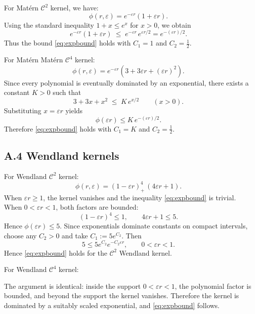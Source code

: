 \documentclass[preprint]{elsarticle}       %
\begin{document}
For Mat\'ern $\mathcal{C}^2$ kernel, we have:
\[
\phi(r,\varepsilon)=e^{-\varepsilon r}(1+\varepsilon r).
\]
Using the standard inequality $1+x\le e^x$ for $x>0$, we obtain
\[
e^{-\varepsilon r}(1+\varepsilon r)
\;\le\;
e^{-\varepsilon r}\,e^{\varepsilon r/2}
=
e^{-(\varepsilon r)/2}.
\]
Thus the bound \eqref{eq:expbound} holds with $C_1=1$ and $C_2=\tfrac12$.
\vspace{0.5cm}

For Mat\'ern Mat\'ern $\mathcal{C}^4$ kernel:
\[
\phi(r,\varepsilon)=e^{-\varepsilon r}\left(3 + 3\varepsilon r + (\varepsilon r)^2\right).
\]
Since every polynomial is eventually dominated by an exponential, there exists
a constant $K>0$ such that
\[
3 + 3x + x^2 \;\le\; K\,e^{x/2} \qquad (x>0).
\]
Substituting $x=\varepsilon r$ yields
\[
\phi(\varepsilon r)\le K\,e^{-(\varepsilon r)/2}.
\]
Therefore \eqref{eq:expbound} holds with $C_1=K$ and $C_2=\tfrac12$.

\subsection*{A.4 Wendland kernels}
\vspace{0.5cm}

For Wendland $\mathcal{C}^2$ kernel:
\[
\phi(r,\varepsilon)
=
(1-\varepsilon r)^4_+\,(4\varepsilon r+1).
\]
When $\varepsilon r\ge 1$, the kernel vanishes and the inequality 
\eqref{eq:expbound} is trivial.  
When $0 < \varepsilon r < 1$, both factors are bounded:
\[
(1-\varepsilon r)^4 \le 1,
\qquad
4\varepsilon r+1 \le 5.
\]
Hence $\phi(\varepsilon r)\le 5$.  Since exponentials dominate constants on
compact intervals, choose any $C_2>0$ and take 
$C_1 := 5 e^{C_2}$.  Then
\[
5 \le 5e^{C_2} e^{-C_2\varepsilon r},
\qquad 0<\varepsilon r<1.
\]
Hence \eqref{eq:expbound} holds for the $\mathcal{C}^2$ Wendland kernel.
\vspace{0.5cm}

For Wendland $\mathcal{C}^4$ kernel:

The argument is identical: inside the support $0<\varepsilon r<1$, the
polynomial factor is bounded, and beyond the support the kernel vanishes.
Therefore the kernel is dominated by a suitably scaled exponential, and
\eqref{eq:expbound} follows.
\end{document}
